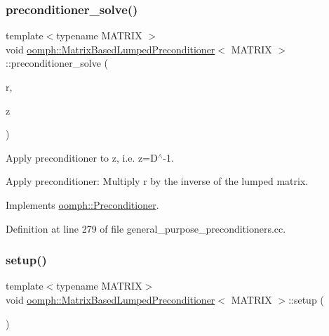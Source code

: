 \subsubsection{\texorpdfstring{preconditioner\+\_\+solve()}{preconditioner\_solve()}}
{\footnotesize\ttfamily template$<$typename M\+A\+T\+R\+IX $>$ \\
void \hyperlink{classoomph_1_1MatrixBasedLumpedPreconditioner}{oomph\+::\+Matrix\+Based\+Lumped\+Preconditioner}$<$ M\+A\+T\+R\+IX $>$\+::preconditioner\+\_\+solve (\begin{DoxyParamCaption}\item[{const \hyperlink{classoomph_1_1DoubleVector}{Double\+Vector} \&}]{r,  }\item[{\hyperlink{classoomph_1_1DoubleVector}{Double\+Vector} \&}]{z }\end{DoxyParamCaption})\hspace{0.3cm}{\ttfamily [virtual]}}



Apply preconditioner to z, i.\+e. z=D$^\wedge$-\/1. 

Apply preconditioner\+: Multiply r by the inverse of the lumped matrix. 

Implements \hyperlink{classoomph_1_1Preconditioner_ace1199369e4465cd2b9a34884bb64ec8}{oomph\+::\+Preconditioner}.



Definition at line 279 of file general\+\_\+purpose\+\_\+preconditioners.\+cc.

\mbox{\label{classoomph_1_1MatrixBasedLumpedPreconditioner_a7fc9e4c0ef357cbbc421a5fb37076edb}} 
\subsubsection{\texorpdfstring{setup()}{setup()}\hspace{0.1cm}{\footnotesize\ttfamily [1/3]}}
{\footnotesize\ttfamily template$<$typename M\+A\+T\+R\+IX$>$ \\
void \hyperlink{classoomph_1_1MatrixBasedLumpedPreconditioner}{oomph\+::\+Matrix\+Based\+Lumped\+Preconditioner}$<$ M\+A\+T\+R\+IX $>$\+::setup (\begin{DoxyParamCaption}{ }\end{DoxyParamCaption})\hspace{0.3cm}{\ttfamily [virtual]}}



